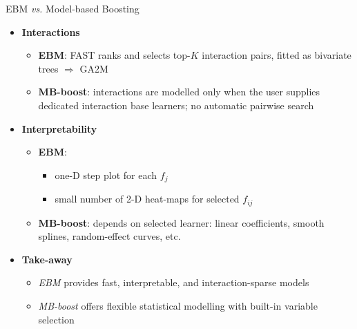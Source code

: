 \documentclass[11pt,compress,t,notes=noshow, aspectratio=169, xcolor=table]{beamer}
\begin{document}
\begin{frame}{EBM \textit{vs.} Model-based Boosting}
\small
\begin{itemize}
  \item \textbf{Interactions}
        \begin{itemize}
          \item \textbf{EBM}: FAST ranks and selects top-$K$ interaction pairs, fitted as bivariate trees $\Rightarrow$ GA2M  
          \item \textbf{MB-boost}: interactions are modelled only when the
                user supplies dedicated interaction base learners;
                no automatic pairwise search
        \end{itemize}
\pause
  \item \textbf{Interpretability}
        \begin{itemize}
          \item \textbf{EBM}:
          \begin{itemize}
              \item one-D step plot for each $f_{j}$
              \item small number of 2-D heat-maps for selected $f_{ij}$
          \end{itemize} 
          \item \textbf{MB-boost}: depends on selected learner: linear
                coefficients, smooth splines, random-effect curves, etc. %
        \end{itemize}
\pause
  \item \textbf{Take-away}  
  \begin{itemize}
      \item \emph{EBM} provides fast, interpretable, and interaction-sparse models
      \item \emph{MB-boost} offers flexible statistical modelling with built-in variable selection %
  \end{itemize}
\end{itemize}
\end{frame}


\endlecture
\end{document}
